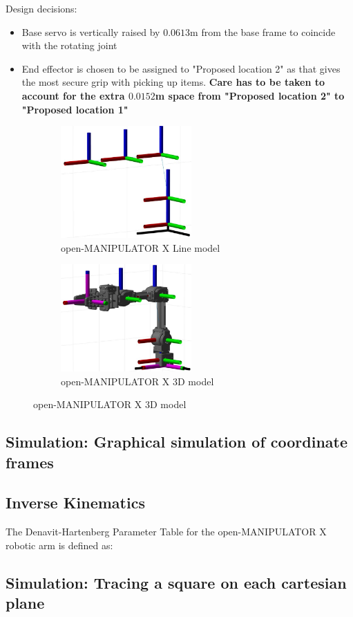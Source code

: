 \documentclass[10pt, a4paper]{article}
\begin{document}
Design decisions:
\begin{itemize}
    \item Base servo is vertically raised by $0.0613$m from the base frame to
    coincide with the rotating joint 

    \item End effector is chosen to be assigned to "Proposed location 2" as that
    gives the most secure grip with picking up items. \textbf{Care has to be taken to
    account for the extra $0.0152$m space from "Proposed location 2" to
    "Proposed location 1"}
\end{itemize}


\begin{figure}[h!]
    \centering
    \begin{subfigure}{.5\textwidth}
      \centering
      \includegraphics[width=5cm]{Line model.JPG}
      \caption{open-MANIPULATOR X Line model}
    \end{subfigure}%
    \begin{subfigure}{.5\textwidth}
      \centering
      \includegraphics[width=5cm]{Robotic model.JPG}
      \caption{open-MANIPULATOR X 3D model}
    \end{subfigure}
\end{figure}

\vfill
\pagebreak

\subsection{Simulation: Graphical simulation of coordinate frames}

\subsection{Inverse Kinematics}

The Denavit-Hartenberg Parameter Table for the open-MANIPULATOR X robotic arm is
defined as:


\subsection{Simulation: Tracing a square on each cartesian plane}

    
\end{document}
